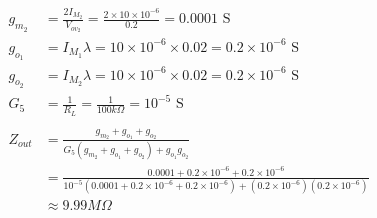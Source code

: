\begin{enumerate}
\begin{align*}
      g_{m_2} &= \frac{2 I_{M_2}}{V_{ov_2}} = \frac{2 \times 10 \times 10^{-6}}{0.2} = 0.0001 \text{ S} \\
      g_{o_1} &= I_{M_1} \lambda = 10 \times 10^{-6} \times 0.02 = 0.2 \times 10^{-6} \text{ S} \\
      g_{o_2} &= I_{M_2} \lambda = 10 \times 10^{-6} \times 0.02 = 0.2 \times 10^{-6} \text{ S} \\
      G_5 &= \frac{1}{R_L} = \frac{1}{100 k\Omega} = 10^{-5} \text{ S} \\
      \\
      Z_{out} &= \frac{g_{m_2} + g_{o_1} + g_{o_2}}{G_{5}(g_{m_2} + g_{o_1} + g_{o_2}) + g_{o_1} g_{o_2}} \\
              &= \frac{0.0001 + 0.2 \times 10^{-6} + 0.2 \times 10^{-6}}{10^{-5}(0.0001 + 0.2 \times 10^{-6} + 0.2 \times 10^{-6}) + (0.2 \times 10^{-6})(0.2 \times 10^{-6})} \\
              &\approx 9.99 M\Omega
    \end{align*}
\end{enumerate}

